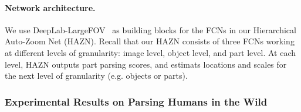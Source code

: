 \paragraph{\textbf{Network architecture.}}
We use DeepLab-LargeFOV~\cite{chen2016deeplab} as building blocks for the FCNs in our Hierarchical Auto-Zoom Net (HAZN).
Recall that our HAZN consists of three FCNs working at different levels of granularity: image level, object level, and part level.
At each level, HAZN outputs part parsing scores, and estimats locations and scales for the next level of granularity (e.g. objects or parts).

\subsubsection{Experimental Results on Parsing Humans in the Wild}
\label{subsubsec:human_parsing_eccv}

